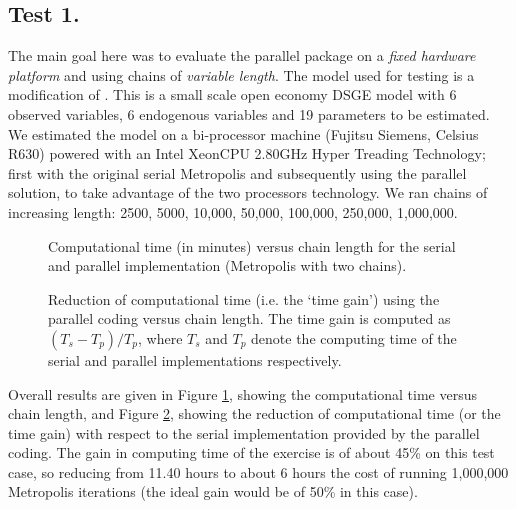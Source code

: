 \documentclass[12pt,a4paper,pdftex]{article}
\begin{document}
\subsection{Test 1.}\label{s:test1}
The main goal here was to evaluate the parallel package on a \emph{fixed hardware platform} and using chains of \emph{variable length}. The model used for testing is a modification of \cite{Hradisky_etal_2006}. This is a small scale open economy DSGE model with 6 observed variables, 6 endogenous variables and 19 parameters to be estimated.
We estimated the model on a bi-processor machine (Fujitsu Siemens, Celsius R630) powered with an Intel\textsuperscript{\textregistered} Xeon\texttrademark CPU 2.80GHz Hyper Treading Technology; first with the original serial Metropolis and subsequently using the parallel solution, to take advantage of the two processors technology. We ran chains of increasing length: 2500, 5000, 10,000, 50,000, 100,000, 250,000, 1,000,000.

\begin{figure}[!ht]
\begin{centering}
  \epsfxsize=300pt 
  \caption{Computational time (in minutes) versus chain length for the serial and parallel implementation (Metropolis with two chains).}\label{fig:test_time_comp}
\end{centering}
\end{figure}
\begin{figure}[!ht]
\begin{centering}
  \epsfxsize=300pt 
  \caption{Reduction of computational time (i.e. the `time gain') using the parallel coding versus chain length. The time gain is computed as $(T_s-T_p)/T_p$, where $T_s$ and $T_p$ denote the computing time of the serial and parallel implementations respectively.}\label{fig:test_gain}
\end{centering}
\end{figure}

Overall results are given in Figure \ref{fig:test_time_comp}, showing the computational time versus chain length, and Figure \ref{fig:test_gain}, showing the reduction of computational time (or the time gain) with respect to the serial implementation provided by the parallel coding. The gain in computing time of the exercise is of about 45\% on this test case, so reducing from 11.40 hours to about 6 hours the cost of running 1,000,000 Metropolis iterations (the ideal gain would be of 50\% in this case).
\end{document}
